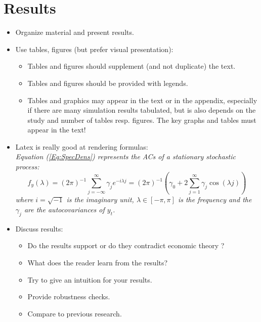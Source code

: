 \documentclass[a4paper,11pt]{article}\usepackage[]{graphicx}\usepackage[]{color}
\begin{document}
\newpage





\section{Results}\label{Sec:Results}

\begin{itemize}

    \item Organize material and present results.

    \item Use tables, figures (but prefer visual presentation):
        \begin{itemize}
            \item Tables and figures should supplement (and not duplicate) the
                text.

            \item Tables and figures should be provided with
            legends.\\

            \item Tables and graphics may appear in the text or in
                the appendix, especially if there are many simulation results
                tabulated, but is also depends on the study and number of tables resp.
                figures. The key graphs and tables must appear in
                the text!
        \end{itemize}

    \item Latex is really good at rendering formulas:\\
        {\it Equation (\ref{Eq:SpecDens}) represents the ACs of a stationary
        stochastic process:
        \begin{equation}
            f_y(\lambda) = (2\pi)^{-1} \sum_{j=-\infty}^{\infty}
                           \gamma_j e^{-i\lambda j}
                         =(2\pi)^{-1}\left(\gamma_0 + 2 \sum_{j=1}^{\infty}
        \gamma_j \cos(\lambda j)\right)
                                        \label{Eq:SpecDens}
        \end{equation}
        where $i=\sqrt{-1}$ is the imaginary unit, $\lambda \in [-\pi,
        \pi]$ is the frequency and the $\gamma_j$ are the autocovariances
        of $y_t$.}

\newpage

    \item Discuss results:
        \begin{itemize}
            \item Do the results support or do they contradict economic theory ?
            \item What does the reader learn from the results?
            \item Try to give an intuition for your results.
            \item Provide robustness checks.
            \item Compare to previous research.
        \end{itemize}
\end{itemize}
\end{document}
